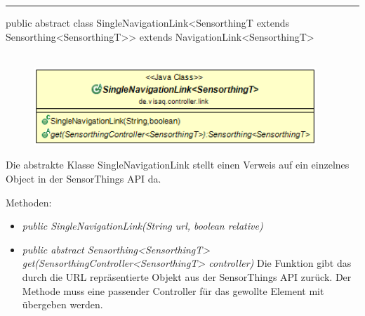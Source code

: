 \rule{\textwidth}{0.4pt}
public abstract class SingleNavigationLink<SensorthingT extends Sensorthing<SensorthingT>> extends NavigationLink<SensorthingT>
\\\\
\begin{minipage}{0.4\textwidth}
    \begin{figure}[H]
        {\centering\includegraphics[width=0.95\textwidth]{media/backend/controller/classes/SingleNavigationLink.png}}
    \end{figure}
    \end{minipage} \hfill
\begin{minipage}{0.6\textwidth}
    Die abstrakte Klasse SingleNavigationLink stellt einen Verweis auf ein einzelnes Object in der \gls{SensorThings API} da.
\end{minipage}

Methoden:
\begin{itemize}
    \item \emph{public SingleNavigationLink(String url, boolean relative)}
    \relativeDescription
    \item \emph{public abstract Sensorthing<SensorthingT> get(SensorthingController<SensorthingT> controller)}
    Die Funktion gibt das durch die URL repräsentierte Objekt aus der \gls{SensorThings API} zurück.
    Der Methode muss eine passender Controller für das gewollte Element mit übergeben werden.
\end{itemize}

